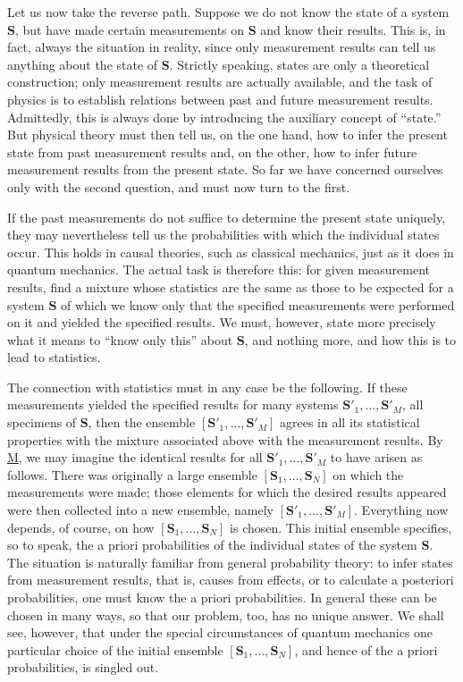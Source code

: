 \documentclass[fontsize=13pt,twoside,openany,headings=normal,parskip=false,bookmarkpackage=false,DIV=calc]{scrbook}
\begin{document}
Let us now take the reverse path. Suppose we do not know the state of a system $\boldsymbol{S}$, but have made certain measurements on $\boldsymbol{S}$ and know their results. This is, in fact, always the situation in reality, since only measurement results can tell us anything about the state of $\boldsymbol{S}$. Strictly speaking, states are only a theoretical construction; only measurement results are actually available, and the task of physics is to establish relations between past and future measurement results. Admittedly, this is always done by introducing the auxiliary concept of ``state.'' But physical theory must then tell us, on the one hand, how to infer the present state from past measurement results and, on the other, how to infer future measurement results from the present state. So far we have concerned ourselves only
\hypertarget{origpage-179}{}%
with the second question, and must now turn to the first.

If the past measurements do not suffice to determine the present state uniquely, they may nevertheless tell us the probabilities with which the individual states occur. This holds in causal theories, such as classical mechanics, just as it does in quantum mechanics. The actual task is therefore this: for given measurement results, find a mixture whose statistics are the same as those to be expected for a system $\boldsymbol{S}$ of which we know only that the specified measurements were performed on it and yielded the specified results. We must, however, state more precisely what it means to ``know only this'' about $\boldsymbol{S}$, and nothing more, and how this is to lead to statistics.

The connection with statistics must in any case be the following. If these measurements yielded the specified results for many systems $\boldsymbol{S}'_1,\ldots,\boldsymbol{S}'_M$, all specimens of $\boldsymbol{S}$, then the ensemble $[\boldsymbol{S}'_1,\ldots,\boldsymbol{S}'_M]$ agrees in all its statistical properties with the mixture associated above with the measurement results. By \hyperref[post:IV.3.M]{M}, we may imagine the identical results for all $\boldsymbol{S}'_1,\ldots,\boldsymbol{S}'_M$ to have arisen as follows. There was originally a large ensemble $[\boldsymbol{S}_1,\ldots,\boldsymbol{S}_N]$ on which the measurements were made; those elements for which the desired results appeared were then collected into a new ensemble, namely $[\boldsymbol{S}'_1,\ldots,\boldsymbol{S}'_M]$. Everything now depends, of course, on how $[\boldsymbol{S}_1,\ldots,\boldsymbol{S}_N]$ is chosen. This initial ensemble specifies, so to speak, the a priori probabilities of the individual states of the system $\boldsymbol{S}$. The situation is naturally familiar from general probability theory: to infer states from measurement results, that is, causes from effects, or to calculate a posteriori probabilities, one must know the a priori probabilities. In general these can be chosen in many ways, so that our problem, too, has no unique answer. We shall see, however, that under the special circumstances of quantum mechanics one particular choice of the initial ensemble $[\boldsymbol{S}_1,\ldots,\boldsymbol{S}_N]$, and hence of the a priori probabilities, is singled out.
\end{document}
